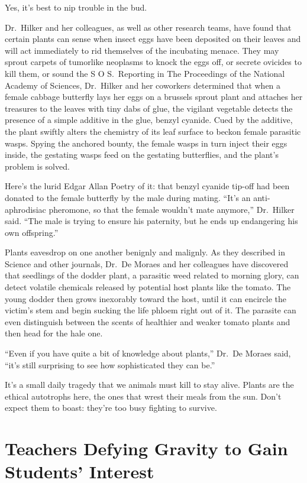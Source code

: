 ﻿\documentclass[12pt]{article}
\begin{document}
Yes, it's best to nip trouble in the bud.

Dr.~Hilker and her colleagues, as well as other research teams, have found that certain plants can
sense when insect eggs have been deposited on their leaves and will act immediately to rid
themselves of the incubating menace. They may sprout carpets of tumorlike neoplasms to knock the
eggs off, or secrete ovicides to kill them, or sound the S O S.~Reporting in The Proceedings of the
National Academy of Sciences, Dr.~Hilker and her coworkers determined that when a female cabbage
butterfly lays her eggs on a brussels sprout plant and attaches her treasures to the leaves with
tiny dabs of glue, the vigilant vegetable detects the presence of a simple additive in the glue,
benzyl cyanide. Cued by the additive, the plant swiftly alters the chemistry of its leaf surface to
beckon female parasitic wasps. Spying the anchored bounty, the female wasps in turn inject their
eggs inside, the gestating wasps feed on the gestating butterflies, and the plant's problem is
solved.

Here's the lurid Edgar Allan Poetry of it: that benzyl cyanide tip-off had been donated to the
female butterfly by the male during mating. ``It's an anti-aphrodisiac pheromone, so that the female
wouldn't mate anymore,'' Dr.~Hilker said. ``The male is trying to ensure his paternity, but he ends
up endangering his own offspring.''

Plants eavesdrop on one another benignly and malignly. As they described in Science and other
journals, Dr.~De Moraes and her colleagues have discovered that seedlings of the dodder plant, a
parasitic weed related to morning glory, can detect volatile chemicals released by potential host
plants like the tomato. The young dodder then grows inexorably toward the host, until it can
encircle the victim's stem and begin sucking the life phloem right out of it. The parasite can even
distinguish between the scents of healthier and weaker tomato plants and then head for the hale one.

``Even if you have quite a bit of knowledge about plants,'' Dr.~De Moraes said, ``it's still
surprising to see how sophisticated they can be.''

It's a small daily tragedy that we animals must kill to stay alive. Plants are the ethical
autotrophs here, the ones that wrest their meals from the sun. Don't expect them to boast: they're
too busy fighting to survive.

\section{Teachers Defying Gravity to Gain Students' Interest}
\end{document}
